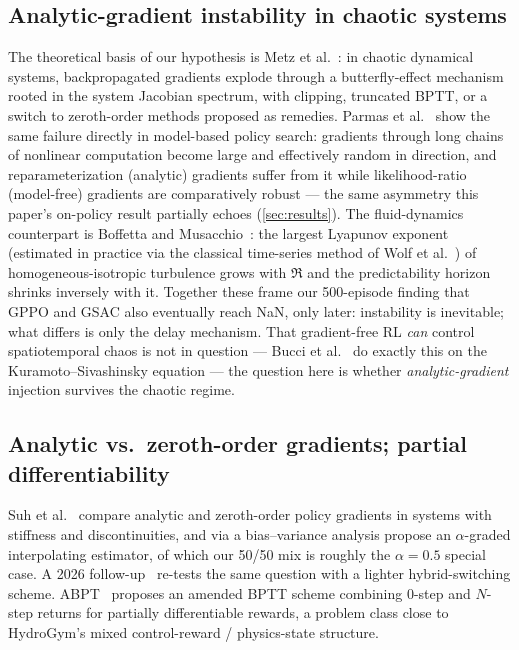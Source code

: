 \subsection{Analytic-gradient instability in chaotic systems}
The theoretical basis of our hypothesis is Metz et al.~\cite{metz2021}: in
chaotic dynamical systems, backpropagated gradients explode through a
butterfly-effect mechanism rooted in the system Jacobian spectrum, with
clipping, truncated BPTT, or a switch to zeroth-order methods proposed as
remedies. Parmas et al.~\cite{parmas2018pipps} show the same failure
directly in model-based policy search: gradients through long chains of
nonlinear computation become large and effectively random in direction, and
reparameterization (analytic) gradients suffer from it while
likelihood-ratio (model-free) gradients are comparatively robust --- the
same asymmetry this paper's on-policy result partially echoes
(\cref{sec:results}). The fluid-dynamics counterpart is Boffetta and
Musacchio~\cite{boffetta2017}: the largest Lyapunov exponent (estimated in
practice via the classical time-series method of Wolf et
al.~\cite{wolf1985lyapunov}) of homogeneous-isotropic turbulence grows with
$\Re$ and the predictability horizon shrinks inversely with it. Together
these frame our 500-episode
finding that GPPO and GSAC also eventually reach NaN, only later: instability
is inevitable; what differs is only the delay mechanism. That gradient-free
RL \emph{can} control spatiotemporal chaos is not in question --- Bucci et
al.~\cite{bucci2019} do exactly this on the Kuramoto--Sivashinsky equation
--- the question here is whether \emph{analytic-gradient} injection survives
the chaotic regime.

\subsection{Analytic vs.\ zeroth-order gradients; partial differentiability}
Suh et al.~\cite{suh2022} compare analytic and zeroth-order policy gradients
in systems with stiffness and discontinuities, and via a bias--variance
analysis propose an $\alpha$-graded interpolating estimator, of which our
50/50 mix is roughly the $\alpha=0.5$ special case. A 2026
follow-up~\cite{onoda2026} re-tests the same question with a lighter
hybrid-switching scheme. ABPT~\cite{abpt2025} proposes an amended BPTT scheme
combining 0-step and $N$-step returns for partially differentiable rewards,
a problem class close to HydroGym's mixed control-reward / physics-state
structure.

